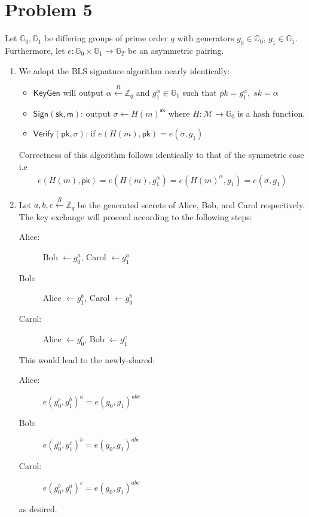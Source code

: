 \documentclass[12pt]{article}%
\begin{document}
\section*{Problem 5}
Let $\mathbb{G}_0, \mathbb{G}_1$ be differing groups of prime order $q$ with generators $g_0 \in \mathbb{G}_0$, $g_1 \in \mathbb{G}_1$. Furthermore, let $e: \mathbb{G}_0 \times \mathbb{G}_1 \rightarrow \mathbb{G}_T$ be an asymmetric pairing.
\begin{enumerate}
  \item We adopt the BLS signature algorithm nearly identically:
  \begin{itemize}
    \item $\mathsf{KeyGen}$ will output $\alpha \xleftarrow{R} \mathbb{Z}_q$ and $g_1^\alpha \in \mathbb{G}_1$ such that $pk = g_1^{\alpha},\; sk = \alpha$
    \item $\mathsf{Sign(sk, m)}$: output $\sigma \leftarrow H(m)^{\mathsf{sk}}$ where $H:\mathcal{M} \rightarrow \mathbb{G}_0$ is a hash function.
    \item $\mathsf{Verify(pk, \sigma)}$: if $e(H(m),\mathsf{pk}) = e(\sigma,g_1)$
  \end{itemize}
  Correctness of this algorithm follows identically to that of the symmetric case i.e
  \begin{align*}
    e(H(m),\mathsf{pk}) = e(H(m), g_1^\alpha) = e(H(m)^\alpha, g_1) = e(\sigma, g_1)
  \end{align*}
  \item
  Let $a,b,c \xleftarrow{R} \mathbb{Z}_q$ be the generated secrets of Alice, Bob, and Carol respectively. The key exchange will proceed according to the following steps:
  \begin{description}
    \item[Alice:] Bob $\leftarrow g_0^a$, Carol $\leftarrow g_1^a$
    \item[Bob:] Alice $\leftarrow g_1^b$, Carol $\leftarrow g_0^b$
    \item[Carol:] Alice $\leftarrow g_0^c$, Bob $\leftarrow g_1^c$
  \end{description}
  This would lead to the newly-shared:

  \begin{description}
    \item[Alice:] $e(g_0^c,g_1^b)^a = e(g_0,g_1)^{abc}$
    \item[Bob:] $e(g_0^a,g_1^c)^b = e(g_0,g_1)^{abc}$
    \item[Carol:] $e(g_0^b,g_1^a)^c = e(g_0,g_1)^{abc}$
  \end{description}
as desired.
\end{enumerate}
\end{document}
